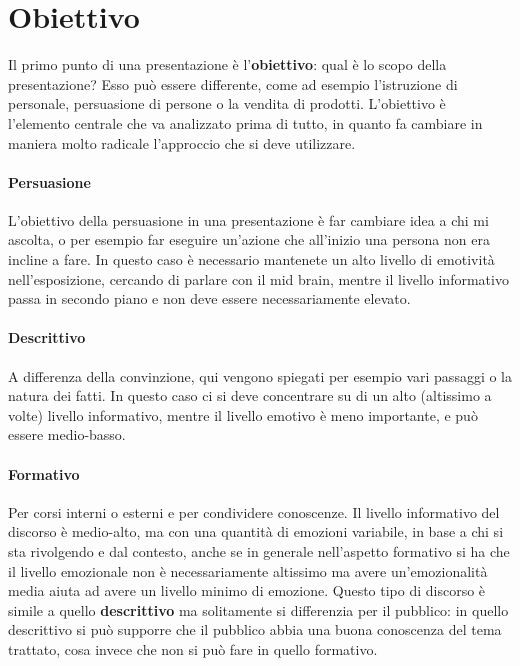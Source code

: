 \section{Obiettivo}

Il primo punto di una presentazione è l'\textbf{obiettivo}: qual è lo scopo
della presentazione? Esso può essere differente, come ad esempio l'istruzione
di personale, persuasione di persone o la vendita di prodotti. L'obiettivo è
l'elemento centrale che va analizzato prima di tutto, in quanto fa
cambiare in maniera molto radicale l'approccio che si deve utilizzare.

\paragraph*{Persuasione} L'obiettivo della persuasione in una presentazione è
far cambiare idea a chi mi ascolta, o per esempio far eseguire un'azione che
all'inizio una persona non era incline a fare. In questo caso è necessario
mantenete un alto livello di emotività nell'esposizione, cercando di parlare
con il mid brain, mentre il livello informativo passa in secondo piano e non
deve essere necessariamente elevato.

\paragraph*{Descrittivo} A differenza della convinzione, qui vengono spiegati
per esempio vari passaggi o la natura dei fatti. In questo caso ci si deve
concentrare su di un alto (altissimo a volte) livello informativo, mentre il
livello emotivo è meno importante, e può essere medio-basso.

\paragraph*{Formativo} Per corsi interni o esterni e per condividere conoscenze.
Il livello informativo del discorso è medio-alto, ma con una quantità di emozioni
variabile, in base a chi si sta rivolgendo e dal contesto, anche se in generale
nell'aspetto formativo si ha che il livello emozionale non è necessariamente
altissimo ma avere un'emozionalità media aiuta ad avere un livello minimo di
emozione. Questo tipo di discorso è simile a quello \textbf{descrittivo} ma
solitamente si differenzia per il pubblico: in quello descrittivo si può
supporre che il pubblico abbia una buona conoscenza del tema trattato, cosa
invece che non si può fare in quello formativo.

